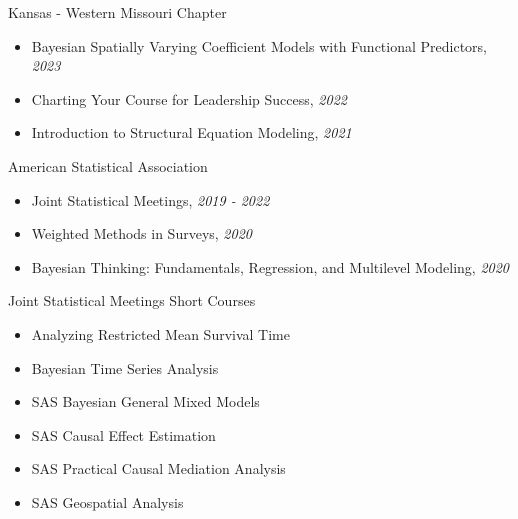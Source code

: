 
\Development
{Kansas - Western Missouri Chapter}
{\begin{itemize}
    \item Bayesian Spatially Varying Coefficient Models with Functional Predictors, \emph{2023}
    \item Charting Your Course for Leadership Success, \emph{2022}
    \item Introduction to Structural Equation Modeling, \emph{2021}
\end{itemize}}

\Development
{American Statistical Association}
{\begin{itemize}
    \item Joint Statistical Meetings, \emph{2019 - 2022}
    \item Weighted Methods in Surveys, \emph{2020}
    \item Bayesian Thinking: Fundamentals, Regression, and Multilevel
            Modeling, \emph{2020}
\end{itemize}}

\Development
{Joint Statistical Meetings Short Courses}
{\begin{itemize}
    \item Analyzing Restricted Mean Survival Time
    \item Bayesian Time Series Analysis
    \item SAS Bayesian General Mixed Models
    \item SAS Causal Effect Estimation
    \item SAS Practical Causal Mediation Analysis
    \item SAS Geospatial Analysis
\end{itemize}}